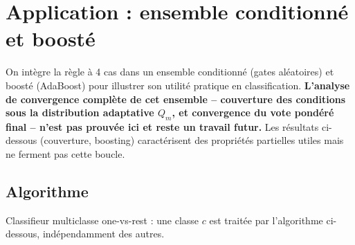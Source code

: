 \documentclass[12pt,a4paper]{article}
\begin{document}
\section*{Application : ensemble conditionné et boosté}

On intègre la règle à 4 cas dans un ensemble conditionné (gates aléatoires)
et boosté (AdaBoost) pour illustrer son utilité pratique en classification.
\textbf{L'analyse de convergence complète de cet ensemble --
couverture des conditions sous la distribution adaptative $Q_m$, et
convergence du vote pondéré final -- n'est pas prouvée ici et reste un
travail futur.} Les résultats ci-dessous (couverture, boosting) caractérisent
des propriétés partielles utiles mais ne ferment pas cette boucle.

\subsection*{Algorithme}

Classifieur multiclasse one-vs-rest : une classe $c$ est traitée par
l'algorithme ci-dessous, indépendamment des autres.
\end{document}
